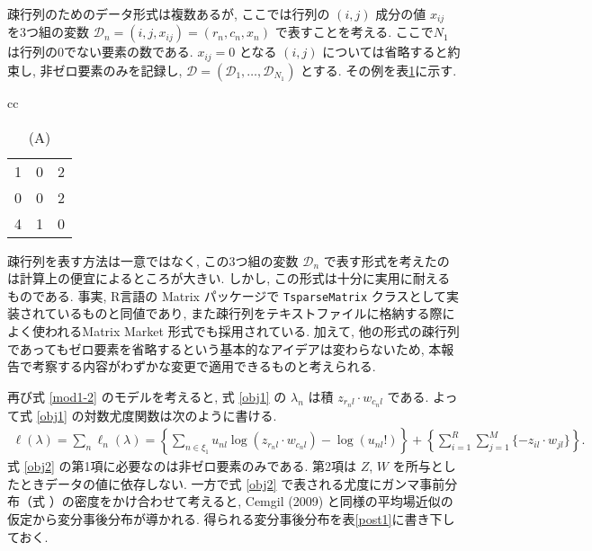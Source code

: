 \documentclass[paper=a4,10.5pt]{jsarticle} %
\numberwithin{equation}{section} %
\begin{document}
疎行列のためのデータ形式は複数あるが, ここでは行列の $(i,j)$ 成分の値 $x_{ij}$ を3つ組の変数 $ \mathcal{D}_n  = (i,j,x_{ij})=(r_n, c_n, x_n)$ で表すことを考える. ここで$N_1$ は行列の0でない要素の数である.  $x_{ij}=0$ となる $(i,j)$ については省略すると約束し, 非ゼロ要素のみを記録し, $\mathcal{D}=(\mathcal{D}_1, \ldots, \mathcal{D}_{N_1})$ とする. その例を表\ref{tab1}に示す. 
\renewcommand{\arraystretch}{0.75}
\begin{table}[tbp]
\centering
\caption{疎行列の例. (A)と(B)は同じ情報を持つ. (B)は本研究で扱う疎行列の形式である. }\label{tab1}
\begin{tabular}{cc}
\begin{subtable}{0.2\linewidth}\centering
{
\caption*{(A)}
\begin{tabular}{|ccc|}
\hline
1 & 0 & 2\\
0 & 0 & 2\\
4 & 1 & 0\\
\hline
\end{tabular}
}
\end{subtable}
\begin{subtable}{0.2\linewidth}
\end{subtable}
\end{tabular}
\end{table}
\renewcommand{\arraystretch}{1}
疎行列を表す方法は一意ではなく, この3つ組の変数 $\mathcal{D}_n$ で表す形式を考えたのは計算上の便宜によるところが大きい. しかし, この形式は十分に実用に耐えるものである. 事実, R言語の Matrix パッケージで \verb|TsparseMatrix| クラスとして実装されているものと同値であり, また疎行列をテキストファイルに格納する際によく使われるMatrix Market 形式でも採用されている.  %
加えて, 他の形式の疎行列であってもゼロ要素を省略するという基本的なアイデアは変わらないため, 本報告で考察する内容がわずかな変更で適用できるものと考えられる.

再び式 \eqref{mod1-2} のモデルを考えると, 式 \eqref{obj1} の $\lambda_n$ は積 $ z_{r_nl} \cdot w_{c_nl}$ である. よって式 \eqref{obj1} の対数尤度関数は次のように書ける. 
\begin{align}
\ell (\lambda) = \sum_n \ell_n (\lambda) = \left\{ \sum_{n \in \xi_1} u_{nl} \log(z_{r_nl} \cdot w_{c_nl})  - \log(u_{nl}!) \right\} + \left\{  \sum_{i=1}^{R}\sum_{j=1}^M  \{-  z_{il}  \cdot w_{jl}\} \right\}. \label{obj2}
\end{align}
式 \eqref{obj2} の第1項に必要なのは非ゼロ要素のみである. 第2項は $Z$, $W$ を所与としたときデータの値に依存しない. 一方で式 \eqref{obj2} で表される尤度にガンマ事前分布（式 ）の密度をかけ合わせて考えると,  Cemgil (2009) と同様の平均場近似の仮定から変分事後分布が導かれる. 得られる変分事後分布を表\ref{post1}に書き下しておく.
\end{document}
